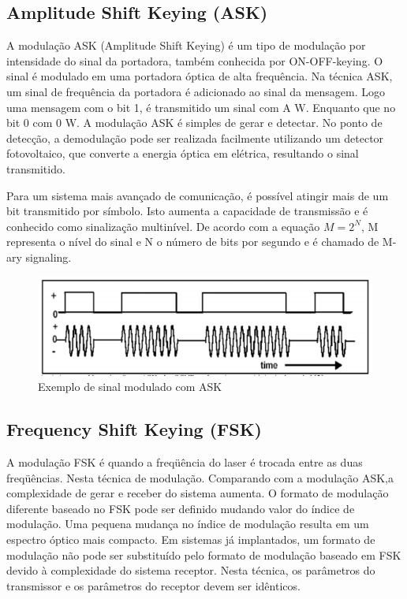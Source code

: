 \documentclass[article]{IEEEtran}
\begin{document}
\subsection{Amplitude Shift Keying (ASK)}
\par A modulação ASK (Amplitude Shift Keying) é um tipo de modulação por intensidade do sinal da portadora, também conhecida por ON-OFF-keying. O sinal é modulado em uma portadora óptica de alta frequência. Na técnica ASK, um sinal de frequência da portadora é adicionado ao sinal da mensagem. Logo uma mensagem com o bit 1, é transmitido um sinal com A W. Enquanto que no bit 0 com 0 W. A modulação ASK é simples de gerar e detectar. No ponto de detecção, a demodulação pode ser realizada facilmente utilizando um detector fotovoltaico, que converte a energia óptica em elétrica, resultando o sinal transmitido.
\par	Para um sistema mais avançado de comunicação, é possível atingir mais de um bit transmitido por símbolo. Isto aumenta a capacidade de transmissão e é conhecido como sinalização multinível. De acordo com a equação $M = 2^N$, M representa o nível do sinal e N o número de bits por segundo e é chamado de M-ary signaling.
\begin{figure}[hb]
\includegraphics[width=\columnwidth]{ask.png}
\caption{Exemplo de sinal modulado com ASK}
\end{figure}

\subsection{Frequency Shift Keying (FSK)}
\par A modulação FSK é quando a freqüência do laser é trocada entre as duas freqüências. Nesta técnica de modulação. Comparando com a modulação ASK,a complexidade de gerar e receber do sistema aumenta. O formato de modulação diferente baseado no FSK pode ser definido mudando valor do índice de modulação. Uma pequena mudança no índice de modulação resulta em um espectro óptico mais compacto. Em sistemas já implantados, um formato de modulação não pode ser substituído pelo formato de modulação baseado em FSK devido à complexidade do sistema receptor. Nesta técnica, os parâmetros do transmissor e os  parâmetros do receptor devem ser idênticos.
\end{document}
